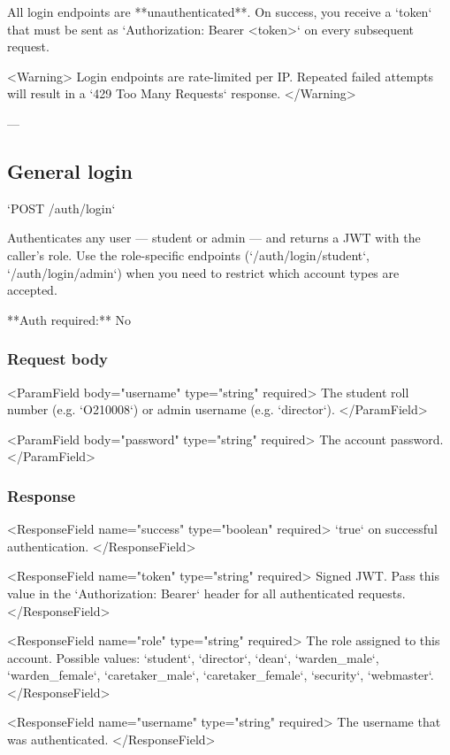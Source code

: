 


All login endpoints are **unauthenticated**. On success, you receive a `token` that must be sent as `Authorization: Bearer <token>` on every subsequent request.

<Warning>
  Login endpoints are rate-limited per IP. Repeated failed attempts will result
  in a `429 Too Many Requests` response.
</Warning>

---

\subsection{General login}

`POST /auth/login`

Authenticates any user — student or admin — and returns a JWT with the caller's role. Use the role-specific endpoints (`/auth/login/student`, `/auth/login/admin`) when you need to restrict which account types are accepted.

**Auth required:** No

\subsubsection{Request body}

<ParamField body="username" type="string" required>
  The student roll number (e.g. `O210008`) or admin username (e.g. `director`).
</ParamField>

<ParamField body="password" type="string" required>
  The account password.
</ParamField>

\subsubsection{Response}

<ResponseField name="success" type="boolean" required>
  `true` on successful authentication.
</ResponseField>

<ResponseField name="token" type="string" required>
  Signed JWT. Pass this value in the `Authorization: Bearer` header for all
  authenticated requests.
</ResponseField>

<ResponseField name="role" type="string" required>
  The role assigned to this account. Possible values: `student`, `director`,
  `dean`, `warden_male`, `warden_female`, `caretaker_male`, `caretaker_female`,
  `security`, `webmaster`.
</ResponseField>

<ResponseField name="username" type="string" required>
  The username that was authenticated.
</ResponseField>

